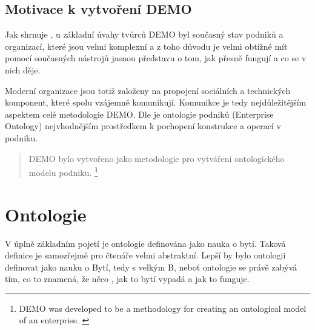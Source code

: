 \documentclass[]{article}
\begin{document}
\subsection{Motivace k vytvoření DEMO}
Jak shrnuje \cite{Vejrazkova2013}, u základní úvahy tvůrců DEMO byl současný stav podniků a organizací, které jsou velmi komplexní a z toho důvodu je velmi obtížné mít pomocí současných nástrojů jasnou představu o tom, jak přesně fungují a co se v nich děje.

Moderní organizace jsou totiž založeny na propojení sociálních a technických komponent, které spolu vzájemně komunikují. Komunikce je tedy nejdůležitějším aspektem celé metodologie DEMO. Dle \cite{Dietz2006} je ontologie podniků (Enterprise Ontology) nejvhodnějším prostředkem k pochopení konstrukce a operací v podniku.

\begin{quote}
DEMO bylo vytvořeno jako metodologie pro vytváření ontologického modelu podniku. \cite{Vejrazkova2012}
\footnote{DEMO was developed to be a methodology for creating an ontological model of an enterprise. \cite{Vejrazkova2012}}
\end{quote}

\section{Ontologie}

V úplně základním pojetí je ontologie definována jako nauka o bytí. Taková definice je samozřejmě pro čtenáře velmi abstraktní. Lepší by bylo ontologii definovat jako nauku o Bytí, tedy s velkým B, neboť ontologie se právě zabývá  tím, co to znamená, že něco , jak to bytí vypadá a jak to funguje.
\end{document}
